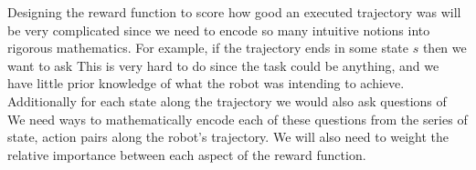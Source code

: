 Designing the reward function to score how good an executed trajectory was will be very complicated since we need to encode so many intuitive notions into rigorous mathematics. For example, if the trajectory ends in some state $s$ then we want to ask  This is very hard to do since the task could be anything, and we have little prior knowledge of what the robot was intending to achieve. Additionally for each state along the trajectory we would also ask questions of    We need ways to mathematically encode each of these questions from the series of state, action pairs along the robot's trajectory. We will also need to weight the relative importance between each aspect of the reward function.\\

